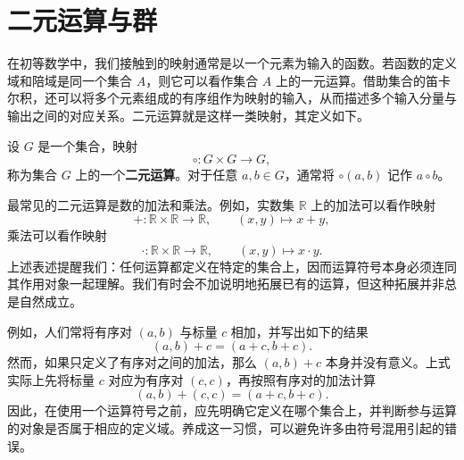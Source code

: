 \section{二元运算与群}
\label{sec_binary_op_group}

在初等数学中，我们接触到的映射通常是以一个元素为输入的函数。若函数的定义域和陪域是同一个集合 \(A\)，则它可以看作集合 \(A\) 上的一元运算。借助集合的笛卡尔积，还可以将多个元素组成的有序组作为映射的输入，从而描述多个输入分量与输出之间的对应关系。二元运算就是这样一类映射，其定义如下。
\begin{definition}[二元运算]
    \label{def_binary_op}
    设 \(G\) 是一个集合，映射
    \[
        \circ:G\times G\rightarrow G,
    \]
    称为集合 \(G\) 上的一个\textbf{二元运算}。对于任意 \(a,b\in G\)，通常将 \(\circ(a,b)\) 记作 \(a\circ b\)。
\end{definition}
最常见的二元运算是数的加法和乘法。例如，实数集 \(\mathbb R\) 上的加法可以看作映射
\[
    +:\mathbb R\times\mathbb R\rightarrow \mathbb R,\qquad (x,y)\mapsto x+y,
\]
乘法可以看作映射
\[
    \cdot:\mathbb R\times \mathbb R\rightarrow \mathbb R,\qquad (x,y)\mapsto x\cdot y.
\]
上述表述提醒我们：任何运算都定义在特定的集合上，因而运算符号本身必须连同其作用对象一起理解。我们有时会不加说明地拓展已有的运算，但这种拓展并非总是自然成立。

例如，人们常将有序对 \((a,b)\) 与标量 \(c\) 相加，并写出如下的结果
\[
    (a,b)+c=(a+c,b+c).
\]
然而，如果只定义了有序对之间的加法，那么 \((a,b)+c\) 本身并没有意义。上式实际上先将标量 \(c\) 对应为有序对 \((c,c)\)，再按照有序对的加法计算
\[
    (a,b)+(c,c)=(a+c,b+c).
\]
因此，在使用一个运算符号之前，应先明确它定义在哪个集合上，并判断参与运算的对象是否属于相应的定义域。养成这一习惯，可以避免许多由符号混用引起的错误。

